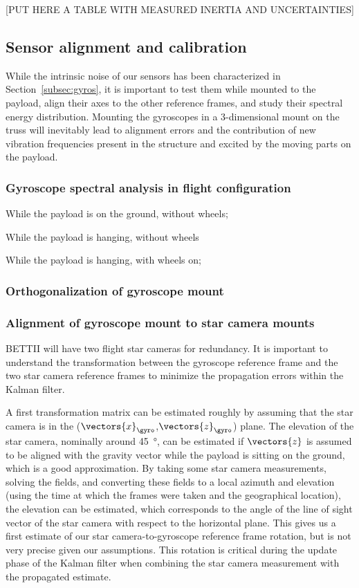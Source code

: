 [PUT HERE A TABLE WITH MEASURED INERTIA AND UNCERTAINTIES]

\subsection{Sensor alignment and calibration}
While the intrinsic noise of our sensors has been characterized in Section~\ref{subsec:gyros}, it is important to test them while mounted to the payload, align their axes to the other reference frames, and study their spectral energy distribution. Mounting the gyroscopes in a 3-dimensional mount on the truss will inevitably lead to alignment errors and the contribution of new vibration frequencies present in the structure and excited by the moving parts on the payload.


\subsubsection{Gyroscope spectral analysis in flight configuration}

While the payload is on the ground, without wheels;

While the payload is hanging, without wheels

While the payload is hanging, with wheels on;

\subsubsection{Orthogonalization of gyroscope mount}
\label{ap:gyroOrth}
\subsubsection{Alignment of gyroscope mount to star camera mounts}

BETTII will have two flight star cameras for redundancy. It is important to understand the transformation between the gyroscope reference frame and the two star camera reference frames to minimize the propagation errors within the Kalman filter. 

A first transformation matrix can be estimated roughly by assuming that the star camera is in the ($\vectors{x}_\gyro$,$\vectors{z}_\gyro$) plane. The elevation of the star camera, nominally around \SI{45}{\degree}, can be estimated if $\vectors{z}$ is assumed to be aligned with the gravity vector while the payload is sitting on the ground, which is a good approximation. By taking some star camera measurements, solving the fields, and converting these fields to a local azimuth and elevation (using the time at which the frames were taken and the geographical location), the elevation can be estimated, which corresponds to the angle of the line of sight vector of the star camera with respect to the horizontal plane. This gives us a first estimate of our star camera-to-gyroscope reference frame rotation, but is not very precise given our assumptions. This rotation is critical during the update phase of the Kalman filter when combining the star camera measurement with the propagated estimate.


